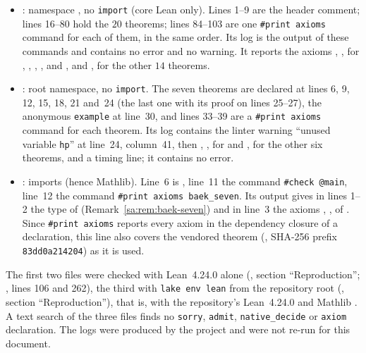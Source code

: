 \begin{itemize}
\item {}: namespace , no \texttt{import} (core Lean only). Lines 1--9
  are the header comment; lines 16--80 hold the $20$ theorems; lines 84--103 are one \texttt{\#print axioms} command
  for each of them, in the same order. Its log  is the output of these
  commands and contains no error and no warning. It reports the axioms , ,
   for , , , ,
   and , and ,  for the other $14$ theorems.
\item {}: root namespace, no \texttt{import}. The seven
  theorems are declared at lines 6, 9, 12, 15, 18, 21 and~24 (the last one with its proof on lines 25--27), the
  anonymous \texttt{example} at line~30, and lines 33--39 are a \texttt{\#print axioms} command for each theorem.
  Its log  contains the linter warning ``unused
  variable \texttt{hp}'' at line~24, column~41, then , ,
   for  and ,  for the other six theorems, and a
  timing line; it contains no error.
\item {}: imports  (hence
  Mathlib). Line~6 is , line~11 the command \mbox{\texttt{\#check @main}}, line~12 the command
  \mbox{\texttt{\#print axioms baek\_seven}}. Its output  gives in
  lines 1--2 the type of  (Remark~\ref{sa:rem:baek-seven}) and in line~3 the axioms ,
  ,  of . Since \texttt{\#print axioms} reports every axiom
  in the dependency closure of a declaration, this line also covers the vendored theorem 
  (, SHA-256 prefix \texttt{83dd0a214204}) as it is used.
\end{itemize}
The first two files were checked with Lean~4.24.0 alone (, section ``Reproduction'';
, lines 106 and 262), the third with \mbox{\texttt{lake env lean}} from the
repository root (, section ``Reproduction''), that is, with the repository's
Lean~4.24.0 and
Mathlib . A text search of the three files finds no \texttt{sorry}, \texttt{admit},
\texttt{native\_decide} or \texttt{axiom} declaration. The logs were produced by the project and were not re-run for
this document.

